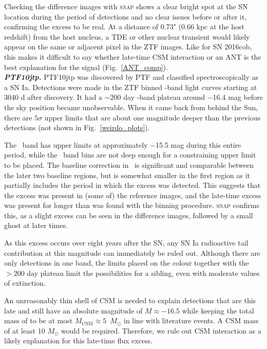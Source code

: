 \documentclass[a4paper,oneside,12pt, class=Latex/Classes/PhDthesisPSnPDF, crop=false]{standalone}
\begin{document}
Checking the difference images with \textsc{snap} shows a clear bright spot at the SN location during the period of detections and no clear issues before or after it, confirming the excess to be real. At a distance of 0.73" (0.66 kpc at the host redshift) from the host nucleus, a TDE or other nuclear transient would likely appear on the same or adjacent pixel in the ZTF images. Like for SN 2016cob, this makes it difficult to say whether late-time CSM interaction or an ANT is the best explanation for the signal (Fig.~\ref{ANT_comp}).\\


\textit{\textbf{PTF10jtp.}}
PTF10jtp was discovered by PTF and classified spectroscopically as a SN Ia. Detections were made in the ZTF binned \ztfr-band light curves starting at 3040 d after discovery. It had a $\sim 200$ day \ztfr-band plateau around $-$16.4 mag before the sky position became unobservable. When it came back from behind the Sun, there are $5\sigma$ upper limits that are about one magnitude deeper than the previous detections (not shown in Fig.~\ref{weirdo_plots}). 

The \ztfg\ band has upper limits at approximately $-$15.5 mag during this entire period, while the \ztfi\ band bins are not deep enough for a constraining upper limit to be placed. The baseline correction in \ztfr\ is significant and comparable between the later two baseline regions, but is somewhat smaller in the first region as it partially includes the period in which the excess was detected. This suggests that the excess was present in (some of) the reference images, and the late-time excess was present for longer than was found with the binning procedure. \textsc{snap} confirms this, as a slight excess can be seen in the difference images, followed by a small ghost at later times.

As this excess occurs over eight years after the SN, any SN Ia radioactive tail contribution at this magnitude can immediately be ruled out. Although there are only detections in one band, the limits placed on the colour together with the $>200$ day plateau limit the possibilities for a sibling, even with moderate values of extinction.

An unreasonably thin shell of CSM is needed to explain detections that are this late and still have an absolute magnitude of $M \approx -16.5$ while keeping the total mass of to be at most $M_\text{CSM} \approx 5$~$M_\odot$ in line with literature events. A CSM mass of at least 10 $M_\odot$ would be required. Therefore, we rule out CSM interaction as a likely explanation for this late-time flux excess. 
\end{document}

